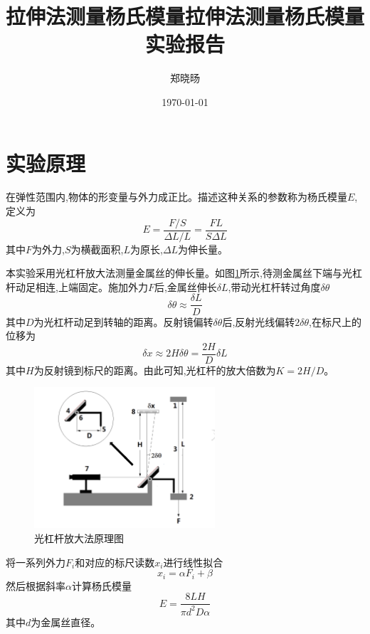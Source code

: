 \documentclass[UTF8]{ctexart}
\title{拉伸法测量杨氏模量}
\title{拉伸法测量杨氏模量实验报告}
\author{郑晓旸}
\date{\today}
\begin{document}
\fancyfoot[C]{\thepage}

\maketitle
\tableofcontents
\newpage
\section{实验原理}

在弹性范围内,物体的形变量与外力成正比。描述这种关系的参数称为杨氏模量$E$,定义为
\begin{equation}
E=\frac{F/S}{\Delta L/L}=\frac{FL}{S\Delta L}
\end{equation}
其中$F$为外力,$S$为横截面积,$L$为原长,$\Delta L$为伸长量。

本实验采用光杠杆放大法测量金属丝的伸长量。如图\ref{fig:principle}所示,待测金属丝下端与光杠杆动足相连,上端固定。施加外力$F$后,金属丝伸长$\delta L$,带动光杠杆转过角度$\delta\theta$
\begin{equation}
\delta\theta\approx\frac{\delta L}{D}
\end{equation}
其中$D$为光杠杆动足到转轴的距离。反射镜偏转$\delta\theta$后,反射光线偏转$2\delta\theta$,在标尺上的位移为
\begin{equation}
\delta x\approx 2H\delta\theta=\frac{2H}{D}\delta L
\end{equation}
其中$H$为反射镜到标尺的距离。由此可知,光杠杆的放大倍数为$K=2H/D$。

\begin{figure}[htbp]
\centering
\includegraphics[width=0.6\textwidth]{principle.png}
\caption{光杠杆放大法原理图}
\label{fig:principle}
\end{figure}

将一系列外力$F_i$和对应的标尺读数$x_i$进行线性拟合
\begin{equation}
x_i=\alpha F_i+\beta
\end{equation}
然后根据斜率$\alpha$计算杨氏模量
\begin{equation}
E=\frac{8LH}{\pi d^2D\alpha}
\end{equation}
其中$d$为金属丝直径。
\end{document}
